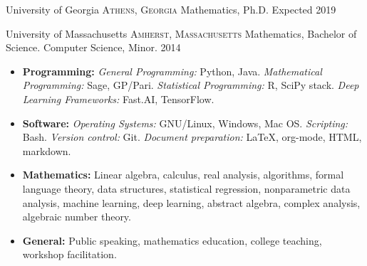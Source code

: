 \documentclass[10pt,a4paper]{article}
\begin{document}

\headedsection
  {University of Georgia}
  {\textsc{Athens, Georgia}} {%
  \headedsubsection
    {Mathematics, Ph.D.}
    {Expected 2019}
    {}
}

\headedsection
  {University of Massachusetts}
  {\textsc{Amherst, Massachusetts}} {%
  \headedsubsection
    {Mathematics, Bachelor of Science. Computer Science, Minor.}
    {2014}
    {}
}

\spacedhrule{0.5em}{-0.4em}


\begin{itemize}
  \item \textbf{Programming:} \textit{General Programming:} Python, Java. \textit{Mathematical Programming:} Sage, GP/Pari. \textit{Statistical Programming:} R, SciPy stack. \textit{Deep Learning Frameworks:} Fast.AI, TensorFlow.
  \item \textbf{Software:} \textit{Operating Systems:} GNU/Linux, Windows, Mac OS. \textit{Scripting:} Bash. \textit{Version control:} Git. \textit{Document preparation:} \LaTeX, org-mode, HTML, markdown.
   \item \textbf{Mathematics:} Linear algebra, calculus, real analysis, algorithms, formal language theory, data structures, statistical regression, nonparametric data analysis, machine learning, deep learning, abstract algebra, complex analysis, algebraic number theory.
   \item \textbf{General:} Public speaking, mathematics education, college teaching, workshop facilitation.
\end{itemize}


\spacedhrule{0.5em}{-0.4em}
\end{document}
